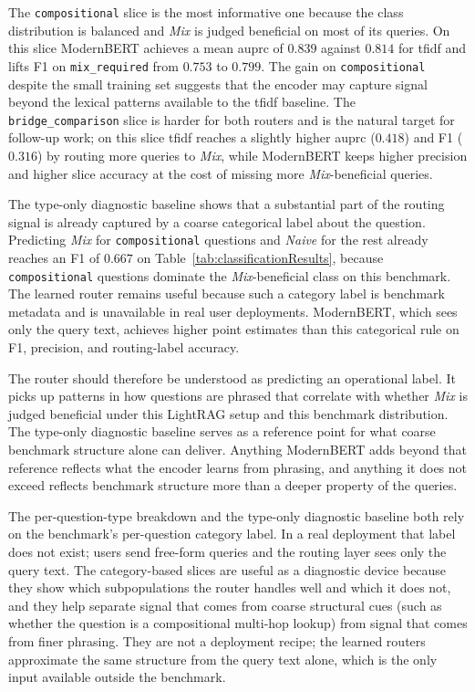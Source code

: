 \documentclass[english, bibtex]{kththesis}               %
\numberwithin{listing}{chapter}
\begin{document}
The \texttt{compositional} slice is the most informative one because the class distribution is balanced and \emph{Mix} is judged beneficial on most of its queries. On this slice ModernBERT achieves a mean \gls{auprc} of $0.839$ against $0.814$ for \gls{tfidf} and lifts F1 on \texttt{mix\_required} from $0.753$ to $0.799$. The gain on \texttt{compositional} despite the small training set suggests that the encoder may capture signal beyond the lexical patterns available to the \gls{tfidf} baseline. The \texttt{bridge\_comparison} slice is harder for both routers and is the natural target for follow-up work; on this slice \gls{tfidf} reaches a slightly higher \gls{auprc} ($0.418$) and F1 ($0.316$) by routing more queries to \emph{Mix}, while ModernBERT keeps higher precision and higher slice accuracy at the cost of missing more \emph{Mix}-beneficial queries.

The type-only diagnostic baseline shows that a substantial part of the routing signal is already captured by a coarse categorical label about the question. Predicting \emph{Mix} for \texttt{compositional} questions and \emph{Naive} for the rest already reaches an F1 of $0.667$ on Table~\ref{tab:classificationResults}, because \texttt{compositional} questions dominate the \emph{Mix}-beneficial class on this benchmark. The learned router remains useful because such a category label is benchmark metadata and is unavailable in real user deployments. ModernBERT, which sees only the query text, achieves higher point estimates than this categorical rule on F1, precision, and routing-label accuracy.

The router should therefore be understood as predicting an operational label. It picks up patterns in how questions are phrased that correlate with whether \emph{Mix} is judged beneficial under this LightRAG setup and this benchmark distribution. The type-only diagnostic baseline serves as a reference point for what coarse benchmark structure alone can deliver. Anything ModernBERT adds beyond that reference reflects what the encoder learns from phrasing, and anything it does not exceed reflects benchmark structure more than a deeper property of the queries.

The per-question-type breakdown and the type-only diagnostic baseline both rely on the benchmark's per-question category label. In a real deployment that label does not exist; users send free-form queries and the routing layer sees only the query text. The category-based slices are useful as a diagnostic device because they show which subpopulations the router handles well and which it does not, and they help separate signal that comes from coarse structural cues (such as whether the question is a compositional multi-hop lookup) from signal that comes from finer phrasing. They are not a deployment recipe; the learned routers approximate the same structure from the query text alone, which is the only input available outside the benchmark.
\end{document}
